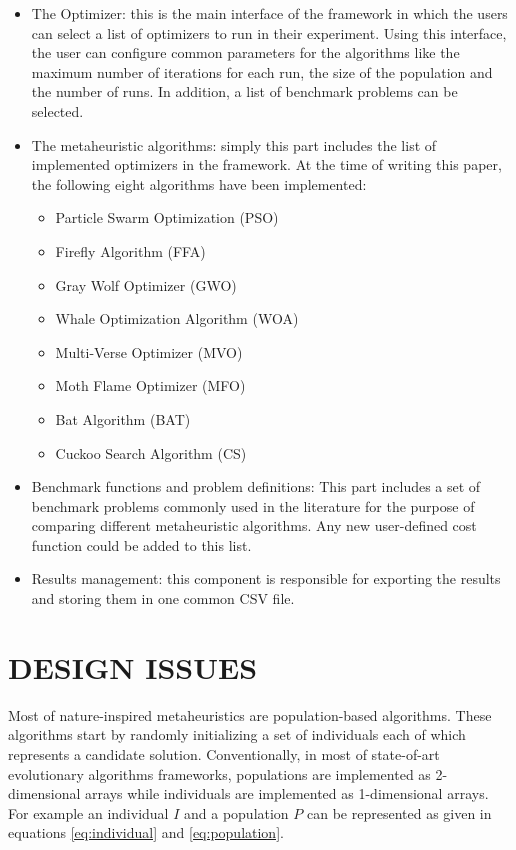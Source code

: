 \documentclass[a4paper,twoside]{article}
\begin{document}
\begin{itemize}
\item The Optimizer: this is the main interface of the framework in which the users can select a list of optimizers to run in their experiment. Using this interface, the user can configure common parameters for the algorithms like the maximum number of iterations for each run, the size of the population and the number of runs. In addition, a list of benchmark problems can be selected.

\item The metaheuristic algorithms: simply this part includes the list of implemented optimizers in the framework. At the time of writing this paper, the following eight algorithms have been implemented:

\begin{itemize}
\item Particle Swarm Optimization (PSO)
\item  Firefly Algorithm (FFA) \cite{Yang2010FFA} 
\item Gray Wolf Optimizer (GWO)\cite{Mirjalili201446}
\item Whale Optimization Algorithm (WOA) \cite{Mirjalili201651}
\item Multi-Verse Optimizer (MVO) \cite{Mirjalili2016}
\item Moth Flame Optimizer (MFO) \cite{Mirjalili2015228}
\item Bat Algorithm (BAT) \cite{Yang2010}
\item Cuckoo Search Algorithm (CS) \cite{Yang2009}
\end{itemize}



\item Benchmark functions and problem definitions: This part includes a set of benchmark problems commonly used in the literature for the purpose of comparing different metaheuristic algorithms. Any new user-defined cost function could be added to this list.

\item Results management: this component is responsible for exporting the results and storing them in one common CSV file. 
\end{itemize}


\section{\uppercase{Design issues}}

Most of nature-inspired metaheuristics are population-based algorithms. These algorithms start by randomly initializing a set of individuals each of which represents a candidate solution. Conventionally, in most of state-of-art evolutionary algorithms frameworks, populations are implemented as 2-dimensional arrays while individuals are implemented as 1-dimensional arrays. For example an individual $I$ and a population $P$ can be represented as given in equations \ref{eq:individual} and \ref{eq:population}.
\end{document}
